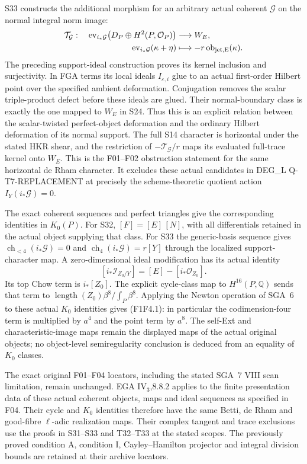 S33 constructs the additional morphism for an arbitrary actual
coherent $\mathcal G$ on the normal integral norm image:
\[
 \begin{split}
 \mathcal T_{\mathcal G}:\quad
 \operatorname{ev}_{i_*\mathcal G}
     \bigl(D_P\oplus H^2(P,\mathcal O_P)\bigr)
       &\longrightarrow W_E,\\
 \operatorname{ev}_{i_*\mathcal G}(\kappa+\eta)
       &\longmapsto-r\operatorname{ob}_{\rm jet,E}(\kappa).
 \end{split}
\]
The preceding support-ideal construction proves its kernel
inclusion and surjectivity. In FGA terms its local ideals
$I_{\varepsilon,i}$ glue to an actual first-order Hilbert
point over the specified ambient deformation. Conjugation
removes the scalar triple-product defect before these ideals
are glued. Their normal-boundary class is exactly the one
mapped to $W_E$ in S24. Thus this is an explicit relation
between the scalar-twisted perfect-object deformation and
the ordinary Hilbert deformation of its normal support.
The full S14 character is horizontal under the stated HKR
shear, and the restriction of $-\mathcal T_{\mathcal G}/r$
maps its evaluated full-trace kernel onto $W_E$.
This is the F01--F02 obstruction statement for the same
horizontal de Rham character. It excludes these actual
candidates in DEG\_L Q-T7-REPLACEMENT at precisely the
scheme-theoretic quotient action $I_Y(i_*\mathcal G)=0$.

The exact coherent sequences and perfect triangles give the
corresponding identities in $K_0(P)$. For S32,
$[F]=[E]\,[N]$, with all differentials retained in the
actual object supplying that class. For S33 the generic-basis
sequence gives $\operatorname{ch}_{<4}(i_*\mathcal G)=0$
and $\operatorname{ch}_4(i_*\mathcal G)=r[Y]$ through
the localized support-character map. A zero-dimensional
ideal modification has its actual identity
\[
 [i_*\mathcal I_{Z_0/Y}]=[E]-[i_*\mathcal O_{Z_0}].
\]
Its top Chow term is $i_*[Z_0]$. The explicit cycle-class
map to $H^{16}(P,\mathbb Q)$ sends that term to
$\operatorname{length}(Z_0)\beta^8/\int_P\beta^8$.
Applying the Newton operation of SGA~6 to these actual
$K_0$ identities gives (F1F4.1): in particular the
codimension-four term is multiplied by $a^4$ and the
point term by $a^8$. The self-Ext and characteristic-image
maps remain the displayed maps of the actual original
objects; no object-level semiregularity conclusion is
deduced from an equality of $K_0$ classes.

The exact original F01--F04 locators, including the stated
SGA~7 VIII scan limitation, remain unchanged. EGA
IV$_3$,8.8.2 applies to the finite presentation data of
these actual coherent objects, maps and ideal sequences
as specified in F04. Their cycle and $K_0$ identities
therefore have the same Betti, de Rham and good-fibre
$\ell$-adic realization maps. Their complex tangent and
trace exclusions use the proofs in S31--S33 and T32--T33
at the stated scopes. The previously proved condition A,
condition I, Cayley--Hamilton projector and integral
division bounds are retained at their archive locators.


